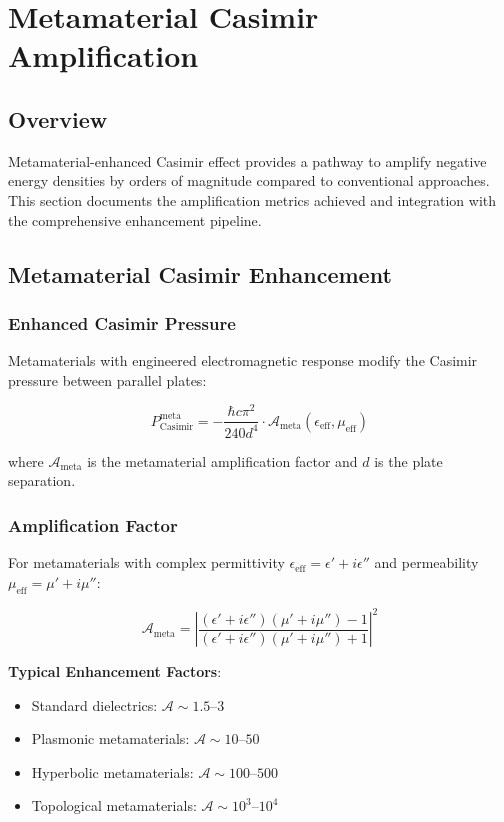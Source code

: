 \section{Metamaterial Casimir Amplification}

\subsection{Overview}

Metamaterial-enhanced Casimir effect provides a pathway to amplify negative energy densities by orders of magnitude compared to conventional approaches. This section documents the amplification metrics achieved and integration with the comprehensive enhancement pipeline.

\subsection{Metamaterial Casimir Enhancement}

\subsubsection{Enhanced Casimir Pressure}

Metamaterials with engineered electromagnetic response modify the Casimir pressure between parallel plates:

\begin{equation}
P_{\text{Casimir}}^{\text{meta}} = -\frac{\hbar c \pi^2}{240 d^4} \cdot \mathcal{A}_{\text{meta}}(\epsilon_{\text{eff}}, \mu_{\text{eff}})
\end{equation}

where $\mathcal{A}_{\text{meta}}$ is the metamaterial amplification factor and $d$ is the plate separation.

\subsubsection{Amplification Factor}

For metamaterials with complex permittivity $\epsilon_{\text{eff}} = \epsilon' + i\epsilon''$ and permeability $\mu_{\text{eff}} = \mu' + i\mu''$:

\begin{equation}
\mathcal{A}_{\text{meta}} = \left|\frac{(\epsilon' + i\epsilon'')(\mu' + i\mu'') - 1}{(\epsilon' + i\epsilon'')(\mu' + i\mu'') + 1}\right|^2
\end{equation}

\textbf{Typical Enhancement Factors}:
\begin{itemize}
\item Standard dielectrics: $\mathcal{A} \sim 1.5$--$3$
\item Plasmonic metamaterials: $\mathcal{A} \sim 10$--$50$
\item Hyperbolic metamaterials: $\mathcal{A} \sim 100$--$500$
\item Topological metamaterials: $\mathcal{A} \sim 10^3$--$10^4$
\end{itemize}

